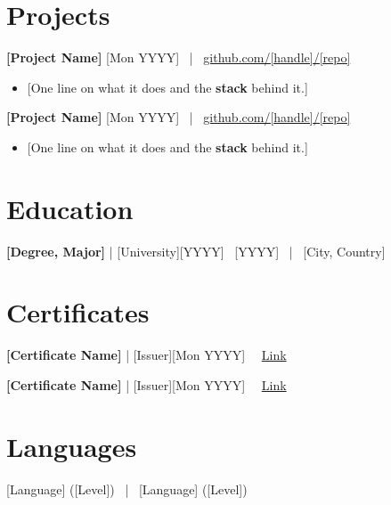 \documentclass[10pt,a4paper]{article}
\begin{document}
\section{Projects}
{\bfseries [Project Name]} \hfill {\small\color{muted}[Mon YYYY] \ | \ \href{https://github.com/[handle]/[repo]}{github.com/[handle]/[repo]}}\par
\begin{itemize}
  \item{} [One line on what it does and the \textbf{stack} behind it.]
\end{itemize}
{\bfseries [Project Name]} \hfill {\small\color{muted}[Mon YYYY] \ | \ \href{https://github.com/[handle]/[repo]}{github.com/[handle]/[repo]}}\par
\begin{itemize}
  \item{} [One line on what it does and the \textbf{stack} behind it.]
\end{itemize}

\section{Education}
{\bfseries [Degree, Major]} \textcolor{accent}{| [University]}\hfill {\small\color{muted}[YYYY] \textendash\ [YYYY] \ | \ [City, Country]}\par

\section{Certificates}
{\bfseries [Certificate Name]} \textcolor{accent}{| [Issuer]}\hfill {\small\color{muted}[Mon YYYY] \ \textbar\ \href{https://[certificate-url]}{\textcolor{accent}{Link}}}\par
{\bfseries [Certificate Name]} \textcolor{accent}{| [Issuer]}\hfill {\small\color{muted}[Mon YYYY] \ \textbar\ \href{https://[certificate-url]}{\textcolor{accent}{Link}}}\par

\section{Languages}
[Language] ([Level]) \ | \ [Language] ([Level])
\end{document}

